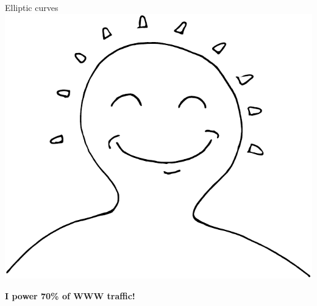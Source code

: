 \documentclass{beamer}
\newif\ifmacron
\begin{document}
\begin{frame}{Elliptic curves}
  \transdissolve
  \centering
  \includegraphics[height=0.7\textheight]{ec-happy}

  \Large\bf I power 70\% of WWW traffic!
\end{frame}


\ifmacron
{
  \setbeamercolor{background canvas}{bg=black}
  \setbeamercolor{frametitle}{fg=white!70!black}
  \begin{frame}[plain]
    \begin{tikzpicture}[remember picture,overlay,white]
      \large\bf
      \node(pic)[at=(current page.center)] {
        \texttt{[image: macron-pollice.jpg]}
      };
    \end{tikzpicture}
  \end{frame}
}
\fi

\end{document}
